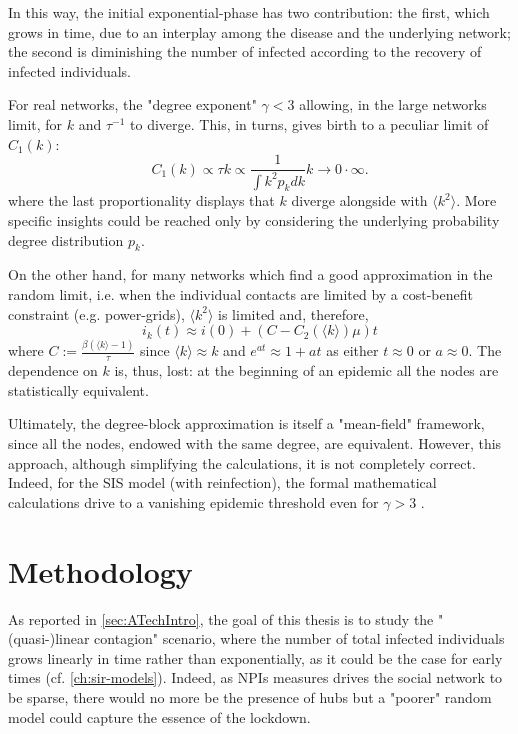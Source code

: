 \documentclass[a4paper,12pt,twoside]{book} %
\theoremstyle{definition}
\begin{document}
In this way, the initial exponential-phase has two contribution: the first, which grows in time, due to an interplay among the disease and the underlying network; the second is diminishing the number of infected according to the recovery of infected individuals.

For real networks, the "degree exponent" $\gamma<3$ allowing, in the large networks limit, for $k$ and $\tau^{-1}$ to diverge. This, in turns, gives birth to a peculiar limit of $C_1(k)$: \vspace{3mm}
\begin{equation}
	C_1(k)\propto \tau k \propto \frac{1}{\int k^2 p_k dk}k  \to 0 \cdot \infty.
\end{equation}
where the last proportionality displays that $k$ diverge alongside with $\langle k^2 \rangle$. More specific insights could be reached only by considering the underlying probability degree distribution $p_k$.

On the other hand, for many networks which find a good approximation in the random limit, i.e. when the individual contacts are limited by a cost-benefit constraint (e.g. power-grids), $\langle k^2 \rangle $ is limited and, therefore,
\begin{equation}
	i_k(t) \approx i(0)  + \left(C - C_2(\langle k \rangle )\mu \right) t
\end{equation}
where $C:= \frac{\beta (\langle k \rangle -1)}{\tau}$ since $\langle k \rangle \approx k$ and $e^{at}\approx1+at$ as either $t\approx0$ or $a \approx 0$. \vspace{3mm} The dependence on $k$ is, thus, lost: at the beginning of an epidemic all the nodes are statistically equivalent.

Ultimately, the degree-block approximation is itself a "mean-field" framework, since all the nodes, endowed with the same degree, are equivalent. However, this approach, although simplifying the calculations, it is not completely correct. Indeed, for the SIS model (with reinfection), the formal mathematical calculations drive to a vanishing epidemic threshold even for $\gamma>3$ \cite{barabasi::2016networkbook}. 

\chapter{Methodology}
As reported in \autoref{sec:ATechIntro}, the goal of this thesis is to study the "(quasi-)linear contagion" scenario, where the number of total infected individuals grows linearly in time rather than exponentially, as it could be the case for early times (cf. \autoref{ch:sir-models}). Indeed, as NPIs measures drives the social network to be sparse, there would no more be the presence of hubs but a "poorer" random model could capture the essence of the lockdown.
\end{document}
